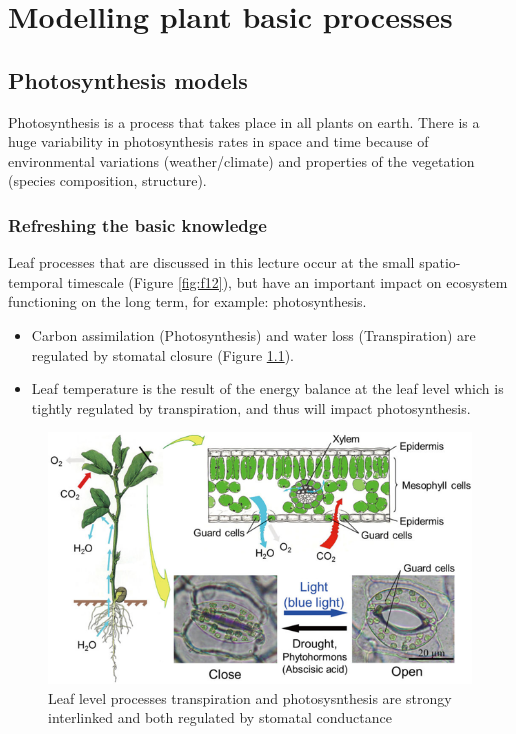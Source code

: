 \documentclass[
  12pt,
  oneside]{book}
\providecommand{\tightlist}{%
  \setlength{\itemsep}{0pt}\setlength{\parskip}{0pt}}
\begin{document}
\hypertarget{modelling-plant-basic-processes}{%
\chapter{Modelling plant basic processes}\label{modelling-plant-basic-processes}}


\hypertarget{photosynthesis-models}{%
\section{Photosynthesis models}\label{photosynthesis-models}}

Photosynthesis is a process that takes place in all plants on earth. There is a huge variability in photosynthesis rates in space and time because of environmental variations (weather/climate) and properties of the vegetation (species composition, structure).

\hypertarget{refreshing-the-basic-knowledge}{%
\subsection{Refreshing the basic knowledge}\label{refreshing-the-basic-knowledge}}

Leaf processes that are discussed in this lecture occur at the small spatio-temporal timescale (Figure \ref{fig:f12}), but have an important impact on ecosystem functioning on the long term, for example: photosynthesis.

\begin{itemize}
\tightlist
\item
  Carbon assimilation (Photosynthesis) and water loss (Transpiration) are regulated by stomatal closure (Figure \ref{fig:f21}).
\item
  Leaf temperature is the result of the energy balance at the leaf level which is tightly regulated by transpiration, and thus will impact photosynthesis.
\end{itemize}

\begin{figure}

{\centering \includegraphics[width=0.8\linewidth]{figures/chap2/leaf_level_processes} 

}

\caption{Leaf level processes transpiration and photosysnthesis are strongy interlinked and both regulated by stomatal conductance}\label{fig:f21}
\end{figure}
\end{document}
